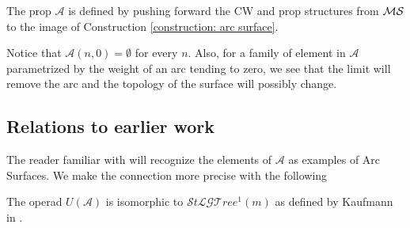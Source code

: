\begin{definition}
	The prop $\mathcal{A}$ is defined by pushing forward the CW and prop structures from $\mathcal{MS}$ to the image of Construction \ref{construction: arc surface}.
\end{definition}

\begin{remark} \label{remark: what happends when the weight goes to 0}
	Notice that $\mathcal A(n,0) = \emptyset$ for every $n$. Also, for a family of element in $\mathcal A$ parametrized by the weight of an arc tending to zero, we see that the limit will remove the arc and the topology of the surface will possibly change.
\end{remark}

\subsection{Relations to earlier work}

The reader familiar with \cite{kaufmann03arc} will recognize the elements of $\mathcal A$ as examples of Arc Surfaces. We make the connection more precise with the following

\begin{proposition} \label{theorem: StLGThree and K are isomorphic}
	The operad $U(\mathcal{A})$ is isomorphic to $\mathcal{S}t\mathcal{LGT}ree^1(m)$ as defined by Kaufmann in \cite{kaufmann09dimension}.
\end{proposition}


